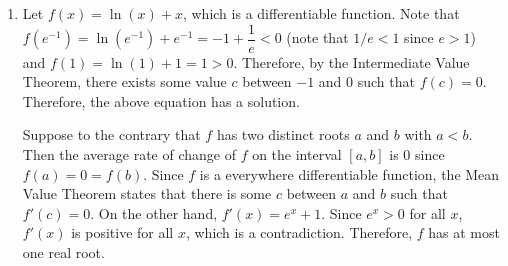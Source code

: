 \documentclass{book}
\begin{document}
\begin{appendices}
\begin{enumerate}[!HW!]
\begin{pf}
Suppose to the contrary that $f$ has two distinct roots $a$ and $b$ with $a< b$. Then the average rate of change of $f$ on the interval $[a,b]$ is 0 since $f(a) = 0 = f(b)$. Since $f$ is a everywhere differentiable function, the Mean Value Theorem states that there is some $c$ between $a$ and $b$ such that $f'(c) = 0$. On the other hand, $f'(x) = e^x+1$. Since $e^x>0$ for all $x$, $f'(x)$ is positive for all $x$, which is a contradiction. Therefore, $f$ has at most one real root.
\end{pf}
\item \begin{pf}
Let $f(x)=\ln(x)+x$, which is a differentiable function. Note that $f(e^{-1}) = \ln(e^{-1}) + e^{-1} = -1+\dfrac{1}{e} < 0$ (note that  $1/e<1$ since $e>1$) and $f(1) = \ln(1)+1 = 1 > 0$. Therefore, by the Intermediate Value Theorem, there exists some value $c$ between $-1$ and $0$ such that $f(c) = 0$. Therefore, the above equation has a solution.

Suppose to the contrary that $f$ has two distinct roots $a$ and $b$ with $a< b$. Then the average rate of change of $f$ on the interval $[a,b]$ is 0 since $f(a) = 0 = f(b)$. Since $f$ is a everywhere differentiable function, the Mean Value Theorem states that there is some $c$ between $a$ and $b$ such that $f'(c) = 0$. On the other hand, $f'(x) = e^x+1$. Since $e^x>0$ for all $x$, $f'(x)$ is positive for all $x$, which is a contradiction. Therefore, $f$ has at most one real root.
\end{pf}
\end{enumerate}
\vspace{-15pt}



\end{appendices}
\end{document}
